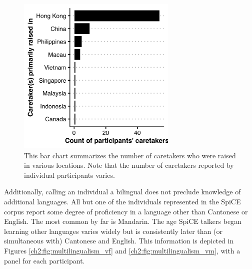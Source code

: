 \begin{figure}[!htbp]
  \begin{center}
  \includegraphics[width=3in]{figures/ch2_caretakers_3in.png} 
  \caption{This bar chart summarizes the number of caretakers who were raised in various locations. Note that the number of caretakers reported by individual participants varies.}
  \label{ch2:fig:caretakers}
  \end{center}
\end{figure}

Additionally, calling an individual a bilingual does not preclude knowledge of additional languages. All but one of the individuals represented in the SpiCE corpus report some degree of proficiency in a language other than Cantonese or English. The most common by far is Mandarin. The age SpiCE talkers began learning other languages varies widely but is consistently later than (or simultaneous with) Cantonese and English. This information is depicted in Figures \ref{ch2:fig:multilingualism_vf} and \ref{ch2:fig:multilingualism_vm}, with a panel for each participant.

